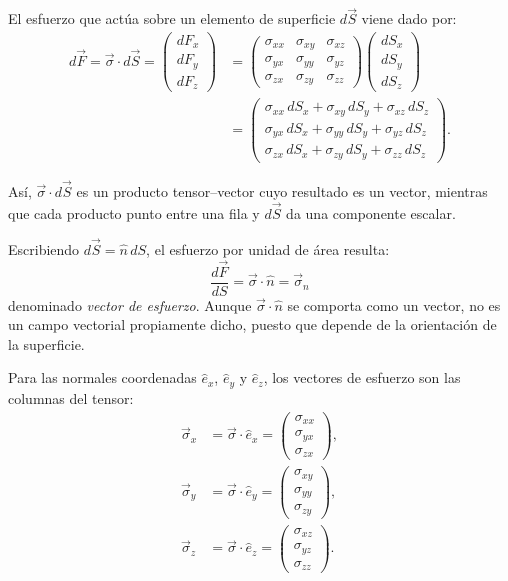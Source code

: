 El esfuerzo que actúa sobre un elemento de superficie $d\vec{S}$ viene dado por:
\[
\begin{aligned}
d\vec F = \vec\sigma\cdot d\vec S
= \begin{pmatrix} dF_x \\ dF_y \\ dF_z \end{pmatrix}
&= \begin{pmatrix}
\sigma_{xx} & \sigma_{xy} & \sigma_{xz} \\
\sigma_{yx} & \sigma_{yy} & \sigma_{yz} \\
\sigma_{zx} & \sigma_{zy} & \sigma_{zz}
\end{pmatrix}
\begin{pmatrix} dS_x \\ dS_y \\ dS_z \end{pmatrix} \\[6pt]
&= \begin{pmatrix}
\sigma_{xx}\,dS_x + \sigma_{xy}\,dS_y + \sigma_{xz}\,dS_z \\
\sigma_{yx}\,dS_x + \sigma_{yy}\,dS_y + \sigma_{yz}\,dS_z \\
\sigma_{zx}\,dS_x + \sigma_{zy}\,dS_y + \sigma_{zz}\,dS_z
\end{pmatrix}.
\end{aligned}
\]

Así, $\vec\sigma\cdot d\vec S$ es un producto tensor--vector cuyo resultado es un vector, mientras que cada producto punto entre una fila y $d\vec S$ da una componente escalar.

Escribiendo $d\vec{S} = \hat{n}\,dS$, el esfuerzo por unidad de área resulta:
$$ \frac{d\vec{F}}{dS} = \vec{\sigma} \cdot \hat{n}=\vec{\sigma}_n $$
denominado \emph{vector de esfuerzo}. Aunque $\vec{\sigma} \cdot \hat{n}$ se comporta como un vector, no es un campo vectorial propiamente dicho, puesto que depende de la orientación de la superficie.

Para las normales coordenadas $\hat e_x$, $\hat e_y$ y $\hat e_z$, los vectores de esfuerzo son las columnas del tensor:
\[
\begin{aligned}
\vec\sigma_x &= \vec\sigma\cdot\hat e_x
= \begin{pmatrix} \sigma_{xx} \\ \sigma_{yx} \\ \sigma_{zx} \end{pmatrix}, \\[6pt]
\vec\sigma_y &= \vec\sigma\cdot\hat e_y
= \begin{pmatrix} \sigma_{xy} \\ \sigma_{yy} \\ \sigma_{zy} \end{pmatrix}, \\[6pt]
\vec\sigma_z &= \vec\sigma\cdot\hat e_z
= \begin{pmatrix} \sigma_{xz} \\ \sigma_{yz} \\ \sigma_{zz} \end{pmatrix}.
\end{aligned}
\]

